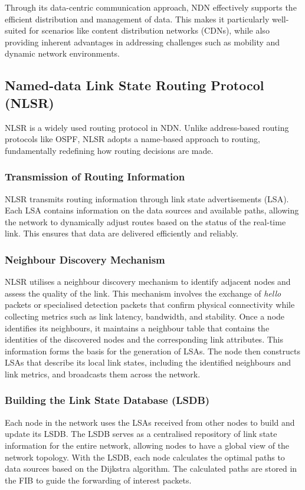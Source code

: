 \documentclass[conference]{IEEEtran}
\begin{document}
Through its data-centric communication approach, NDN effectively supports the efficient distribution and management of data. This makes it particularly well-suited for scenarios like content distribution networks (CDNs), while also providing inherent advantages in addressing challenges such as mobility and dynamic network environments.

\subsection{Named-data Link State Routing Protocol (NLSR)}
NLSR is a widely used routing protocol in NDN. Unlike address-based routing protocols like OSPF, NLSR adopts a name-based approach to routing, fundamentally redefining how routing decisions are made.
\subsubsection{Transmission of Routing Information}
NLSR transmits routing information through link state advertisements (LSA). Each LSA contains information on the data sources and available paths, allowing the network to dynamically adjust routes based on the status of the real-time link. This ensures that data are delivered efficiently and reliably.
\subsubsection{Neighbour Discovery Mechanism}
NLSR utilises a neighbour discovery mechanism to identify adjacent nodes and assess the quality of the link. This mechanism involves the exchange of \textit{hello} packets or specialised detection packets that confirm physical connectivity while collecting metrics such as link latency, bandwidth, and stability. Once a node identifies its neighbours, it maintains a neighbour table that contains the identities of the discovered nodes and the corresponding link attributes. This information forms the basis for the generation of LSAs. The node then constructs LSAs that describe its local link states, including the identified neighbours and link metrics, and broadcasts them across the network.
\subsubsection{Building the Link State Database (LSDB)}
Each node in the network uses the LSAs received from other nodes to build and update its LSDB. The LSDB serves as a centralised repository of link state information for the entire network, allowing nodes to have a global view of the network topology. With the LSDB, each node calculates the optimal paths to data sources based on the Dijkstra algorithm. The calculated paths are stored in the FIB to guide the forwarding of interest packets.
\end{document}
